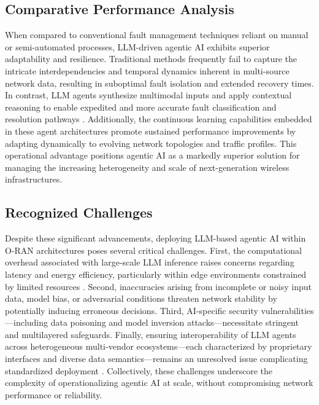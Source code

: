 \documentclass[sigconf]{acmart}
\begin{document}
\subsection{Comparative Performance Analysis}

When compared to conventional fault management techniques reliant on manual or semi-automated processes, LLM-driven agentic AI exhibits superior adaptability and resilience. Traditional methods frequently fail to capture the intricate interdependencies and temporal dynamics inherent in multi-source network data, resulting in suboptimal fault isolation and extended recovery times. In contrast, LLM agents synthesize multimodal inputs and apply contextual reasoning to enable expedited and more accurate fault classification and resolution pathways \cite{ref55}. Additionally, the continuous learning capabilities embedded in these agent architectures promote sustained performance improvements by adapting dynamically to evolving network topologies and traffic profiles. This operational advantage positions agentic AI as a markedly superior solution for managing the increasing heterogeneity and scale of next-generation wireless infrastructures.

\subsection{Recognized Challenges}

Despite these significant advancements, deploying LLM-based agentic AI within O-RAN architectures poses several critical challenges. First, the computational overhead associated with large-scale LLM inference raises concerns regarding latency and energy efficiency, particularly within edge environments constrained by limited resources \cite{ref55,ref48}. Second, inaccuracies arising from incomplete or noisy input data, model bias, or adversarial conditions threaten network stability by potentially inducing erroneous decisions. Third, AI-specific security vulnerabilities---including data poisoning and model inversion attacks---necessitate stringent and multilayered safeguards. Finally, ensuring interoperability of LLM agents across heterogeneous multi-vendor ecosystems---each characterized by proprietary interfaces and diverse data semantics---remains an unresolved issue complicating standardized deployment \cite{ref55,ref48}. Collectively, these challenges underscore the complexity of operationalizing agentic AI at scale, without compromising network performance or reliability.
\end{document}
